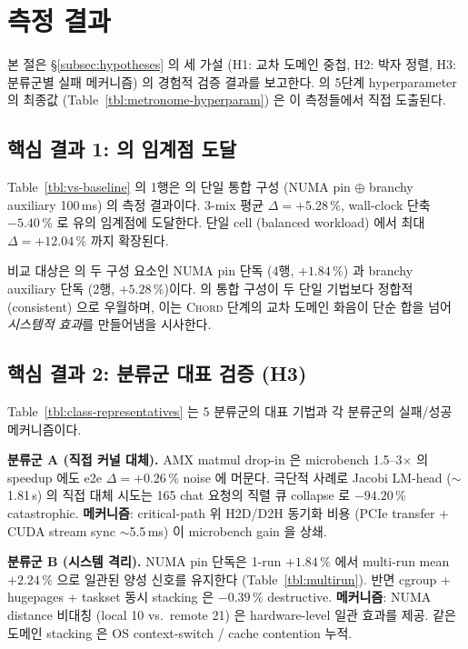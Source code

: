 
\section{측정 결과}
\label{sec:results}

본 절은 \S\ref{subsec:hypotheses} 의 세 가설 (H1: 교차 도메인 중첩, H2: 박자 정렬, H3: 분류군별 실패 메커니즘) 의 경험적 검증 결과를 보고한다.
\algname 의 5단계 hyperparameter 의 최종값 (Table~\ref{tbl:metronome-hyperparam}) 은 이 측정들에서 직접 도출된다.



\subsection{핵심 결과 1: \algname 의 임계점 도달}

Table~\ref{tbl:vs-baseline} 의 1행은 \algname 의 단일 통합 구성 (NUMA pin $\oplus$ branchy auxiliary 100\,ms) 의 측정 결과이다.
3-mix 평균 $\Delta = +5.28\,\%$, wall-clock 단축 $-5.40\,\%$ 로 유의 임계점에 도달한다.
단일 cell (balanced workload) 에서 최대 $\Delta = +12.04\,\%$ 까지 확장된다.

비교 대상은 \algname 의 두 구성 요소인 NUMA pin 단독 (4행, $+1.84\,\%$) 과 branchy auxiliary 단독 (2행, $+5.28\,\%$)이다.
\algname 의 통합 구성이 두 단일 기법보다 정합적 (consistent) 으로 우월하며, 이는 \textsc{Chord} 단계의 교차 도메인 화음이 단순 합을 넘어 \emph{시스템적 효과}를 만들어냄을 시사한다.

\subsection{핵심 결과 2: 분류군 대표 검증 (H3)}



Table~\ref{tbl:class-representatives} 는 5 분류군의 대표 기법과 각 분류군의 실패/성공 메커니즘이다.

\textbf{분류군 A (직접 커널 대체).}
AMX matmul drop-in 은 microbench 1.5--3$\times$ 의 speedup 에도 e2e $\Delta = +0.26\,\%$ noise 에 머문다.
극단적 사례로 Jacobi LM-head ($\sim$1.81\,s) 의 직접 대체 시도는 165 chat 요청의 직렬 큐 collapse 로 $-94.20\,\%$ catastrophic.
\textbf{메커니즘}: critical-path 위 H2D/D2H 동기화 비용 (PCIe transfer + CUDA stream sync $\sim$5.5\,ms) 이 microbench gain 을 상쇄.

\textbf{분류군 B (시스템 격리).}
NUMA pin 단독은 1-run $+1.84\,\%$ 에서 multi-run mean $+2.24\,\%$ 으로 일관된 양성 신호를 유지한다 (Table~\ref{tbl:multirun}).
반면 cgroup + hugepages + taskset 동시 stacking 은 $-0.39\,\%$ destructive.
\textbf{메커니즘}: NUMA distance 비대칭 (local 10 vs.\ remote 21) 은 hardware-level 일관 효과를 제공.
같은 도메인 stacking 은 OS context-switch / cache contention 누적.

